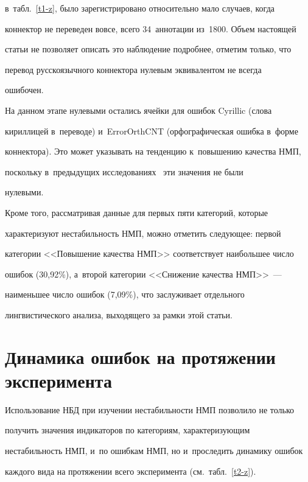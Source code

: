 в~табл.~\ref{t1-z}, было зарегистрировано относительно мало случаев, когда 


коннектор не переведен вовсе, всего 34~аннотации из~1800. Объем настоящей 


статьи не позволяет описать это наблюдение подробнее, отметим только, что 


перевод русскоязычного коннектора нулевым эквивалентом не всегда 


ошибочен.


  


  На данном этапе нулевыми остались ячейки для ошибок Cyrillic (слова 


кириллицей в~переводе) и~ErrorOrthCNT (орфографическая ошибка в~форме 


коннектора). Это может указывать на тенденцию к~повышению качества НМП, 


поскольку в~предыдущих исследованиях~\cite{14-z} эти значения не были 


нулевыми.


  


  Кроме того, рассматривая данные для первых пяти категорий, которые 


характеризуют нестабильность НМП, можно отметить следующее: первой 


категории <<Повышение качества НМП>> соответствует наибольшее число 


ошибок (30,92\%), а~второй категории <<Снижение качества НМП>>~--- 


наименьшее число ошибок (7,09\%), что заслуживает отдельного 


лингвистического анализа, выходящего за рамки этой статьи.


  


\section{Динамика ошибок на протяжении эксперимента}





  Использование НБД при изучении нестабильности НМП позволило не только 


получить значения индикаторов по категориям, характеризующим 


нестабильность НМП, и~по ошибкам НМП, но и~проследить динамику ошибок 


каждого вида на протяжении всего эксперимента (см.\ табл.~\ref{t2-z}).


